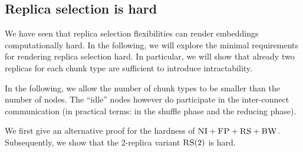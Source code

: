 \documentclass[conference,10pt]{IEEEtran}
\newcommand{\maciek}[1]{\textcolor{brown}{maciek: #1}}
\newcommand{\CC}{\textsc{NI}}
\newcommand{\FP}{\textsc{FP}}
\newcommand{\RS}{\textsc{RS}}
\newcommand{\BW}{\textsc{BW}}
\newcommand{\MA}{\textsc{MA}}
\begin{document}
\begin{appendix}


\section{Replica selection is hard}\label{ap:tworep}

We have seen that replica selection flexibilities can render embeddings computationally hard.
In the following, we will explore the minimal requirements for rendering replica selection hard.
In particular, we will show that already two replicas for each chunk type are sufficient to
introduce intractability.

In the following, we allow the number of chunk types to be smaller than the number of nodes.
 The ``idle'' nodes however do participate in the inter-connect communication (in practical terms: in the shuffle phase
 and the reducing phase).



We first give an alternative proof for the hardness of $\CC+\FP+\RS+\BW$.
Subsequently, we show that the 2-replica variant $\RS(2)$ is hard.



\end{appendix}
\end{document}
